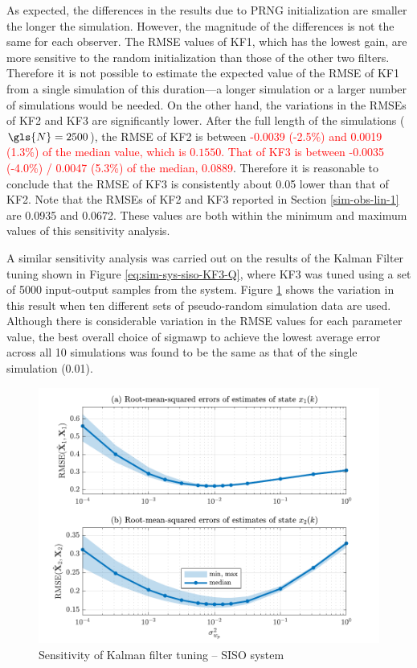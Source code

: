 As expected, the differences in the results due to \gls{PRNG} initialization are smaller the longer the simulation. However, the magnitude of the differences is not the same for each observer. The \gls{RMSE} values of KF1, which has the lowest gain, are more sensitive to the random initialization than those of the other two filters. Therefore it is not possible to estimate the expected value of the \gls{RMSE} of KF1 from a single simulation of this duration---a longer simulation or a larger number of simulations would be needed. On the other hand, the variations in the \gls{RMSE}s of KF2 and KF3 are significantly lower. After the full length of the simulations ($\gls{N}=2500$), the \gls{RMSE} of KF2 is between \textcolor{red}{-0.0039 (-2.5\%) and 0.0019 (1.3\%) of the median value, which is $0.1550$.  That of KF3 is between -0.0035 (-4.0\%) / 0.0047 (5.3\%) of the median, 0.0889}.  Therefore it is reasonable to conclude that the \gls{RMSE} of KF3 is consistently about 0.05 lower than that of KF2. Note that the \gls{RMSE}s of KF2 and KF3 reported in Section \ref{sim-obs-lin-1} are 0.0935 and 0.0672. These values are both within the minimum and maximum values of this sensitivity analysis.

A similar sensitivity analysis was carried out on the results of the Kalman Filter tuning shown in Figure \ref{eq:sim-sys-siso-KF3-Q}, where KF3 was tuned using a set of 5000 input-output samples from the system. Figure \ref{fig:sim-sys-siso-KF3-sensitivity} shows the variation in this result when ten different sets of pseudo-random simulation data are used.  Although there is considerable variation in the \gls{RMSE} values for each parameter value, the best overall choice of \gls{sigmawp} to achieve the lowest average error across all 10 simulations was found to be the same as that of the single simulation (0.01).

\begin{figure}[htp]
	\centering
	\includegraphics[width=14cm]{images/rod_obs_sim1_3KF_Q_statplot.pdf}
	\caption{Sensitivity of Kalman filter tuning – SISO system}
	\label{fig:sim-sys-siso-KF3-sensitivity}
\end{figure}

